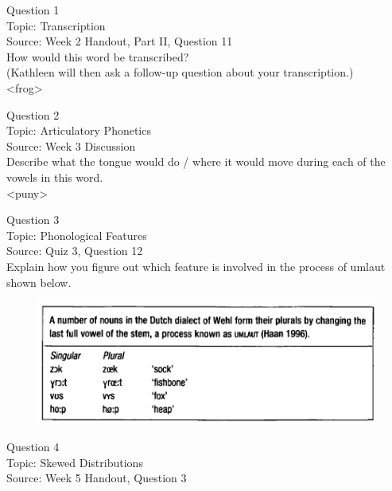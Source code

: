 \documentclass[12pt]{article}
\begin{document}
{\large Question 1}\\

Topic: Transcription\\
Source: Week 2 Handout, Part II, Question 11\\

How would this word be transcribed?\\ (Kathleen will then ask a follow-up question about your transcription.)\\

<frog>


\newpage

{\large Question 2}\\

Topic: Articulatory Phonetics\\
Source: Week 3 Discussion\\

Describe what the tongue would do / where it would move during each of the vowels in this word.\\

<puny>


\newpage

{\large Question 3}\\

Topic: Phonological Features\\
Source: Quiz 3, Question 12\\

Explain how you figure out which feature is involved in the process of umlaut shown below.\\

\begin{figure}[H]
\includegraphics{../images/dutch.png}
\end{figure}

\newpage

{\large Question 4}\\

Topic: Skewed Distributions\\
Source: Week 5 Handout, Question 3\\
\end{document}
